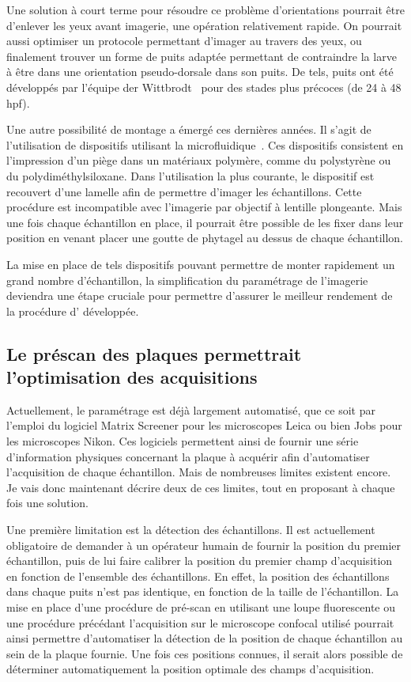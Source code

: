 \documentclass[\main/main.tex]{subfiles}
\begin{document}
%
Une solution à court terme pour résoudre ce problème d'orientations pourrait être d'enlever les yeux avant imagerie, une opération relativement rapide. On pourrait aussi optimiser un protocole permettant d'imager au travers des yeux, ou finalement trouver un forme de puits adaptée permettant de contraindre la larve à être dans une orientation pseudo-dorsale dans son puits. De tels, puits ont été développés par l'équipe der Wittbrodt~\cite{wittbrodt_2014} pour des stades plus précoces (de 24 à 48 hpf).

%
Une autre possibilité de montage a émergé ces dernières années.
%
Il s'agit de l'utilisation de dispositifs utilisant la microfluidique~\cite{khalili_2019}.
%
Ces dispositifs consistent en l'impression d'un piège dans un matériaux polymère, comme du polystyrène ou du polydiméthylsiloxane.
%
Dans l'utilisation la plus courante, le dispositif est recouvert d'une lamelle afin de permettre d'imager les échantillons.
%
Cette procédure est incompatible avec l'imagerie par objectif à lentille plongeante.
%
Mais une fois chaque échantillon en place,
il pourrait être possible de les fixer dans leur position en venant placer une goutte de phytagel au dessus de chaque échantillon.
%

La mise en place de tels dispositifs pouvant permettre de monter rapidement un grand nombre d'échantillon,
la simplification du paramétrage de l'imagerie deviendra une étape cruciale pour permettre d'assurer le meilleur rendement de la procédure d'\hti{} développée.

    \subsection{Le préscan des plaques permettrait l'optimisation des acquisitions}

Actuellement, le paramétrage est déjà largement automatisé,
que ce soit par l'emploi du logiciel Matrix Screener pour les microscopes Leica ou bien Jobs pour les microscopes Nikon.
%
Ces logiciels permettent ainsi de fournir une série d'information physiques concernant la plaque à acquérir afin d'automatiser l'acquisition de chaque échantillon.
%
Mais de nombreuses limites existent encore.
%
Je vais donc maintenant décrire deux de ces limites,
tout en proposant à chaque fois une solution.

%
Une première limitation est la détection des échantillons.
%
Il est actuellement obligatoire de demander à un opérateur humain de fournir la position du premier échantillon,
puis de lui faire calibrer la position du premier champ d'acquisition en fonction de l'ensemble des échantillons.
%
En effet, la position des échantillons dans chaque puits n'est pas identique, en fonction de la taille de l'échantillon. 
%
La mise en place d'une procédure de pré-scan en utilisant une loupe fluorescente ou une procédure précédant l'acquisition sur le microscope confocal utilisé pourrait ainsi permettre d'automatiser la détection de la position de chaque échantillon au sein de la plaque fournie.
%
Une fois ces positions connues, il serait alors possible de déterminer automatiquement la position optimale des  champs d'acquisition.
\end{document}
